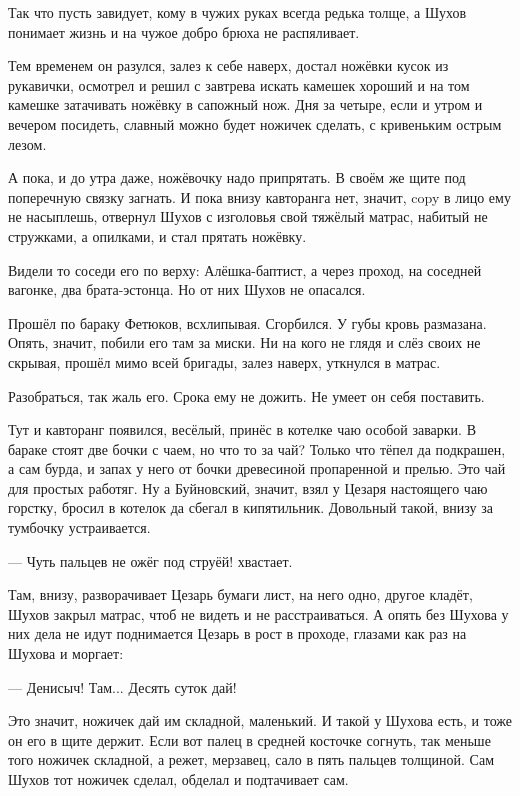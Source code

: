 Так что пусть завидует, кому в чужих руках всегда редька толще, а Шухов понимает жизнь и на
чужое добро брюха не распяливает.

Тем временем он разулся, залез к себе наверх, достал ножёвки кусок из рукавички, осмотрел и
решил с завтрева искать камешек хороший и на том камешке затачивать ножёвку в сапожный нож.
Дня за четыре, если и утром и вечером посидеть, славный можно будет ножичек сделать, с
кривеньким острым лезом.

А пока, и до утра даже, ножёвочку надо припрятать. В своём же щите под поперечную связку
загнать. И пока внизу кавторанга нет, значит, copy в лицо ему не насыплешь, отвернул Шухов с
изголовья свой тяжёлый матрас, набитый не стружками, а опилками, \dash и стал прятать ножёвку.

Видели то соседи его по верху: Алёшка-баптист, а через проход, на соседней вагонке, \dash два
брата-эстонца. Но от них Шухов не опасался.

Прошёл по бараку Фетюков, всхлипывая. Сгорбился. У губы кровь размазана. Опять, значит,
побили его там за миски. Ни на кого не глядя и слёз своих не скрывая, прошёл мимо всей бригады,
залез наверх, уткнулся в матрас.

Разобраться, так жаль его. Срока ему не дожить. Не умеет он себя поставить.

Тут и кавторанг появился, весёлый, принёс в котелке чаю особой заварки. В бараке стоят две
бочки с чаем, но что то за чай? Только что тёпел да подкрашен, а сам бурда, и запах у него от
бочки \dash древесиной пропаренной и прелью. Это чай для простых работяг. Ну а Буйновский,
значит, взял у Цезаря настоящего чаю горстку, бросил в котелок да сбегал в кипятильник.
Довольный такой, внизу за тумбочку устраивается.

--- Чуть пальцев не ожёг под струёй! \dash хвастает.

Там, внизу, разворачивает Цезарь бумаги лист, на него одно, другое кладёт, Шухов закрыл
матрас, чтоб не видеть и не расстраиваться. А опять без Шухова у них дела не идут \dash
поднимается Цезарь в рост в проходе, глазами как раз на Шухова и моргает:

--- Денисыч! Там... Десять суток дай!

Это значит, ножичек дай им складной, маленький. И такой у Шухова есть, и тоже он его в щите
держит. Если вот палец в средней косточке согнуть, так меньше того ножичек складной, а режет,
мерзавец, сало в пять пальцев толщиной. Сам Шухов тот ножичек сделал, обделал и подтачивает
сам.

